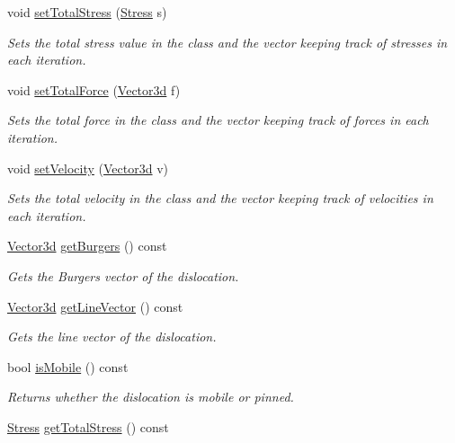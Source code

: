 \begin{DoxyCompactItemize}
void \hyperlink{classDislocation_acc1b0c77cc1150cc7d6d7bc098acb610}{set\-Total\-Stress} (\hyperlink{classStress}{Stress} s)
\begin{DoxyCompactList}\small\item\em Sets the total stress value in the class and the vector keeping track of stresses in each iteration. \end{DoxyCompactList}\item 
void \hyperlink{classDislocation_aebe391b1ed71cd98b506abbdd493fc31}{set\-Total\-Force} (\hyperlink{classVector3d}{Vector3d} f)
\begin{DoxyCompactList}\small\item\em Sets the total force in the class and the vector keeping track of forces in each iteration. \end{DoxyCompactList}\item 
void \hyperlink{classDislocation_aeb55f4d1364d2e33891e41868592c629}{set\-Velocity} (\hyperlink{classVector3d}{Vector3d} v)
\begin{DoxyCompactList}\small\item\em Sets the total velocity in the class and the vector keeping track of velocities in each iteration. \end{DoxyCompactList}\item 
\hyperlink{classVector3d}{Vector3d} \hyperlink{classDislocation_a9eb3cc78d08d26a29d5f318a33f6065e}{get\-Burgers} () const 
\begin{DoxyCompactList}\small\item\em Gets the Burgers vector of the dislocation. \end{DoxyCompactList}\item 
\hyperlink{classVector3d}{Vector3d} \hyperlink{classDislocation_a8ba2d0d68c7b335e5c75b7498b33803d}{get\-Line\-Vector} () const 
\begin{DoxyCompactList}\small\item\em Gets the line vector of the dislocation. \end{DoxyCompactList}\item 
bool \hyperlink{classDislocation_a741fe1113b1693a6b2f3ad364e9508fe}{is\-Mobile} () const 
\begin{DoxyCompactList}\small\item\em Returns whether the dislocation is mobile or pinned. \end{DoxyCompactList}\item 
\hyperlink{classStress}{Stress} \hyperlink{classDislocation_a2e07940bcbec8e998f31769f9cc0f5f2}{get\-Total\-Stress} () const 

\end{DoxyCompactItemize}

